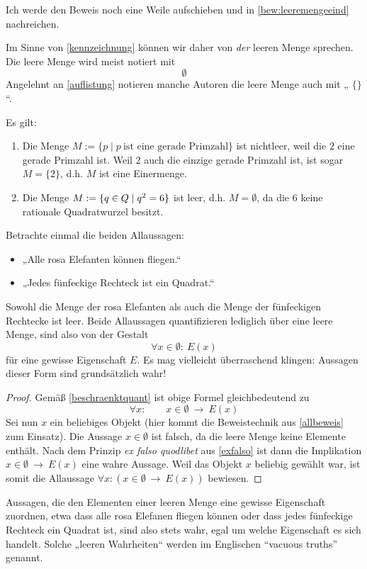 Ich werde den Beweis noch eine Weile aufschieben und in \cref{bew:leeremengeeind} nachreichen.


\begin{nota}
    Im Sinne von \cref{kennzeichnung} können wir daher von \emph{der} leeren Menge sprechen. Die leere Menge wird meist notiert mit
        \[ \emptyset \]
    Angelehnt an \cref{auflistung} notieren manche Autoren die leere Menge auch mit „ $\{\}$ “.
\end{nota}


\begin{bsp}
    Es gilt:
    \begin{enumerate}
        \item Die Menge $M:=\{p\mid p\ \text{ist eine gerade Primzahl}\}$ ist nichtleer, weil die $2$ eine gerade Primzahl ist. Weil $2$ auch die einzige gerade Primzahl ist, ist sogar $M=\{2\}$, d.h. $M$ ist eine Einermenge.
        \item Die Menge $M:= \{ q\in \relax Q\mid q^2=6\}$ ist leer, d.h. $M=\emptyset$, da die $6$ keine rationale Quadratwurzel besitzt.
    \end{enumerate}
\end{bsp}


\begin{bem} \label{vacuoustruth} 
    Betrachte einmal die beiden Allaussagen:
    \begin{itemize}
        \item „Alle rosa Elefanten können fliegen.“
        \item „Jedes fünfeckige Rechteck ist ein Quadrat.“
    \end{itemize}	
    Sowohl die Menge der rosa Elefanten als auch die Menge der fünfeckigen Rechtecke ist leer. Beide Allaussagen quantifizieren lediglich über eine leere Menge, sind also von der Gestalt
        \[ \forall x\in \emptyset:\ E(x) \]
    für eine gewisse Eigenschaft $E$. Es mag vielleicht überraschend klingen: Aussagen dieser Form sind grundsätzlich wahr!
    \begin{proof}
        Gemäß \cref{beschraenktquant} ist obige Formel gleichbedeutend zu
            \[ \forall x:\qquad x\in \emptyset\ \to\ E(x) \]
        Sei nun $x$ ein beliebiges Objekt (hier kommt die Beweistechnik aus \cref{allbeweis} zum Einsatz). Die Aussage $x\in\emptyset$ ist falsch, da die leere Menge keine Elemente enthält. Nach dem Prinzip \emph{ex falso quodlibet} aus \cref{exfalso} ist dann die Implikation $x\in \emptyset\ \to\ E(x)$ eine wahre Aussage. Weil das Objekt $x$ beliebig gewählt war, ist somit die Allaussage $\forall x: \left(x\in \emptyset\ \to\ E(x)\right)$ bewiesen.
	\end{proof}
    Aussagen, die den Elementen einer leeren Menge eine gewisse Eigenschaft zuordnen, etwa dass alle rosa Elefanen fliegen können oder dass jedes fünfeckige Rechteck ein Quadrat ist, sind also stets wahr, egal um welche Eigenschaft es sich handelt. Solche „leeren Wahrheiten“ werden im Englischen ``vacuous truths'' genannt.
\end{bem}


